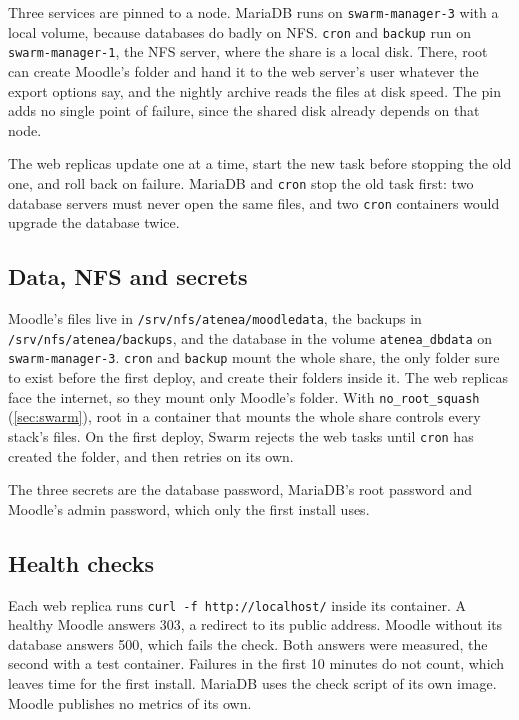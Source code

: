 Three services are pinned to a node. MariaDB runs on
\texttt{swarm-manager-3} with a local volume, because databases do badly
on NFS. \texttt{cron} and \texttt{backup} run on
\texttt{swarm-manager-1}, the NFS server, where the share is a local
disk. There, root can create Moodle's folder and hand it to the web
server's user whatever the export options say, and the nightly archive
reads the files at disk speed. The pin adds no single point of failure,
since the shared disk already depends on that node.

The web replicas update one at a time, start the new task before
stopping the old one, and roll back on failure. MariaDB and
\texttt{cron} stop the old task first: two database servers must never
open the same files, and two \texttt{cron} containers would upgrade the
database twice.

\subsection{Data, NFS and secrets}

Moodle's files live in \texttt{/srv/nfs/atenea/moodledata}, the backups
in \texttt{/srv/nfs/atenea/backups}, and the database in the volume
\texttt{atenea\_dbdata} on \texttt{swarm-manager-3}. \texttt{cron} and
\texttt{backup} mount the whole share, the only folder sure to exist
before the first deploy, and create their folders inside it. The web
replicas face the internet, so they mount only Moodle's folder. With
\texttt{no\_root\_squash} (\cref{sec:swarm}), root in a container that
mounts the whole share controls every stack's files. On the first deploy,
Swarm rejects the web tasks until \texttt{cron} has created the folder,
and then retries on its own.

The three secrets are the database password, MariaDB's root password and
Moodle's admin password, which only the first install uses.

\subsection{Health checks}

Each web replica runs \texttt{curl -f http://localhost/} inside its
container. A healthy Moodle answers 303, a redirect to its public
address. Moodle without its database answers 500, which fails the check.
Both answers were measured, the second with a test container. Failures
in the first 10 minutes do not count, which leaves time for the first
install. MariaDB uses the check script of its own image. Moodle publishes
no metrics of its own.

